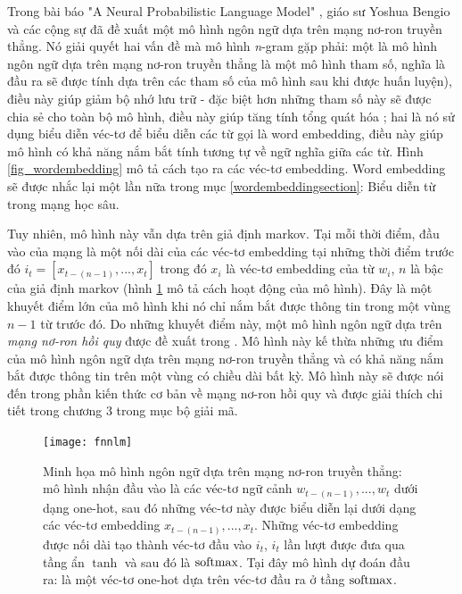 Trong bài báo "A Neural Probabilistic Language Model" \cite{bengioLM2003}, giáo sư Yoshua Bengio và các cộng sự đã đề xuất một mô hình ngôn ngữ dựa trên mạng nơ-ron truyền thẳng. Nó giải quyết hai vấn đề mà mô hình \textit{n}-gram gặp phải: một là mô hình ngôn ngữ dựa trên mạng nơ-ron truyền thẳng là một mô hình tham số, nghĩa là đầu ra sẽ được tính dựa trên các tham số của mô hình sau khi được huấn luyện), điều này giúp giảm bộ nhớ lưu trữ - đặc biệt hơn những tham số này sẽ được chia sẻ cho toàn bộ mô hình, điều này giúp tăng tính tổng quát hóa \cite{bengioLM2003}; hai là nó sử dụng biểu diễn véc-tơ để biểu diễn các từ gọi là word embedding, điều này giúp mô hình có khả năng nắm bắt tính tương tự về ngữ nghĩa giữa các từ. Hình \ref{fig_wordembedding} mô tả cách tạo ra các véc-tơ embedding. Word embedding sẽ được nhắc lại một lần nữa trong mục \ref{wordembeddingsection}: Biểu diễn từ trong mạng học sâu.

Tuy nhiên, mô hình này vẫn dựa trên giả định markov. Tại mỗi thời điểm, đầu vào của mạng là một nối dài của các véc-tơ embedding tại những thời điểm trước đó $i_t = \left[ x_{t-(n-1)},...,x_t \right]$ trong đó $x_i$ là véc-tơ embedding của từ $w_i$, $n$ là bậc của giả định markov (hình \ref{fig_fnnlm} mô tả cách hoạt động của mô hình). Đây là một khuyết điểm lớn của mô hình khi nó chỉ nắm bắt được thông tin trong một vùng $n - 1$ từ trước đó. Do những khuyết điểm này, một mô hình ngôn ngữ dựa trên \textit{mạng nơ-ron hồi quy} được đề xuất trong \cite{mikolovLM}. Mô hình này kế thừa những ưu điểm của mô hình ngôn ngữ dựa trên mạng nơ-ron truyền thẳng và có khả năng nắm bắt được thông tin trên một vùng có chiều dài bất kỳ. Mô hình này sẽ được nói đến trong phần kiến thức cơ bản về mạng nơ-ron hồi quy và được giải thích chi tiết trong chương 3 trong mục bộ giải mã. 

\begin{figure}
	\centering
	\texttt{[image: fnnlm]}
	\caption[Minh họa mô hình ngôn ngữ dựa trên mạng nơ-ron truyền thẳng]{Minh họa mô hình ngôn ngữ dựa trên mạng nơ-ron truyền thẳng: mô hình nhận đầu vào là các véc-tơ ngữ cảnh $w_{t-(n-1)},...,w_t$ dưới dạng one-hot, sau đó những véc-tơ này được biểu diễn lại dưới dạng các véc-tơ embedding $x_{t-(n-1)},...,x_t$. Những véc-tơ embedding được nối dài tạo thành véc-tơ đầu vào $i_t$, $i_t$ lần lượt được đưa qua tầng ẩn $\tanh$ và sau đó là $\mathrm{softmax}$. Tại đây mô hình dự đoán đầu ra: là một véc-tơ one-hot dựa trên véc-tơ đầu ra ở tầng $\mathrm{softmax}$.}
	\label{fig_fnnlm}
\end{figure}

